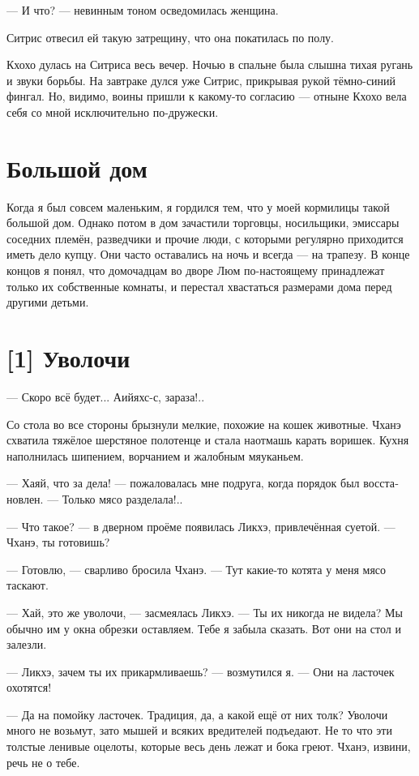 \documentclass[a4paper,12pt,fleqn]{book}\usepackage{polyglossia}\setdefaultlanguage[babelshorthands=true]{russian}\setotherlanguage{english}\defaultfontfeatures{Ligatures=TeX,Mapping=tex-text}\usepackage{xcolor}\newcommand{\ml}[3]{#2}
\begin{document}
{--- И что? --- невинным тоном осведомилась женщина.

Ситрис отвесил ей такую затрещину, что она покатилась по полу.

Кхохо дулась на Ситриса весь вечер.
Ночью в спальне была слышна тихая ругань и звуки борьбы.
На завтраке дулся уже Ситрис, прикрывая рукой тёмно-синий фингал.
Но, видимо, воины пришли к какому-то согласию --- отныне Кхохо вела себя со мной исключительно по-дружески.

\section{Большой дом}

Когда я был совсем маленьким, я гордился тем, что у моей кормилицы такой большой дом.
Однако потом в дом зачастили торговцы, носильщики, эмиссары соседних племён, разведчики и прочие люди, с которыми регулярно приходится иметь дело купцу.
Они часто оставались на ночь и всегда --- на трапезу.
В конце концов я понял, что домочадцам во дворе Люм по-настоящему принадлежат только их собственные комнаты, и перестал хвастаться размерами дома перед другими детьми.

\section{[1] Уволочи}

--- Скоро всё будет...
Аийяхс-с, зараза!..

Со стола во все стороны брызнули мелкие, похожие на кошек животные.
Чханэ схватила тяжёлое шерстяное полотенце и стала наотмашь карать воришек.
Кухня наполнилась шипением, ворчанием и жалобным мяуканьем.

--- Хаяй, что за дела! --- пожаловалась мне подруга, когда порядок был восстановлен.
--- Только мясо разделала!..

--- Что такое? --- в дверном проёме появилась Ликхэ, привлечённая суетой.
--- Чханэ, ты готовишь?

--- Готовлю, --- сварливо бросила Чханэ.
--- Тут какие-то котята у меня мясо таскают.

--- Хай, это же уволочи, --- засмеялась Ликхэ.
--- Ты их никогда не видела?
Мы обычно им у окна обрезки оставляем.
Тебе я забыла сказать.
Вот они на стол и залезли.

--- Ликхэ, зачем ты их прикармливаешь? --- возмутился я.
--- Они на ласточек охотятся!

--- Да на помойку ласточек.
Традиция, да, а какой ещё от них толк?
Уволочи много не возьмут, зато мышей и всяких вредителей подъедают.
Не то что эти толстые ленивые оцелоты, которые весь день лежат и бока греют.
Чханэ, извини, речь не о тебе.

}
\end{document}
